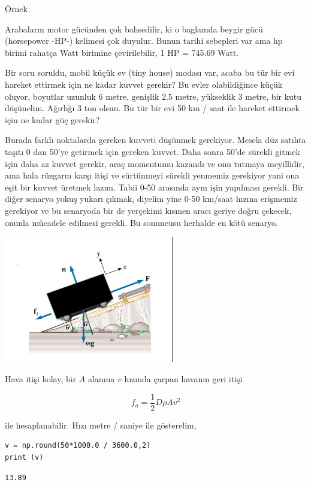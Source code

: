 \documentclass[12pt,fleqn]{article}\usepackage{../../common}
\begin{document}
Örnek

Arabaların motor gücünden çok bahsedilir, ki o baglamda beygir gücü (horsepower
-HP-) kelimesi çok duyulur. Bunun tarihi sebepleri var ama hp birimi rahatça
Watt birimine çevirilebilir, 1 HP = 745.69 Watt.

Bir soru soruldu, mobil küçük ev (tiny house) modası var, acaba bu tür bir evi
hareket ettirmek için ne kadar kuvvet gerekir? Bu evler olabildiğince küçük
oluyor, boyutlar uzunluk 6 metre, genişlik 2.5 metre, yükseklik 3 metre, bir
kutu düşünelim. Ağırlığı 3 ton olsun. Bu tür bir evi 50 km / saat ile hareket
ettirmek için ne kadar güç gerekir?

Burada farklı noktalarda gereken kuvveti düşünmek gerekiyor. Mesela düz satıhta
taşıtı 0 dan 50'ye getirmek için gereken kuvvet. Daha sonra 50'de sürekli gitmek
için daha az kuvvet gerekir, araç momentumu kazandı ve onu tutmaya meyillidir,
ama hala rüzgarın karşı itişi ve sürtünmeyi sürekli yenmemiz gerekiyor yani ona
eşit bir kuvvet üretmek lazım. Tabii 0-50 arasında aynı işin yapılması
gerekli. Bir diğer senaryo yokuş yukarı çıkmak, diyelim yine 0-50 km/saat hızına
erişmemiz gerekiyor ve bu senaryoda bir de yerçekimi kısmen aracı geriye doğru
çekecek, onunla mücadele edilmesi gerekli. Bu sonuncusu herhalde en kötü senaryo.

\includegraphics[width=20em]{phy_005_basics_01_07.jpg}

Hava itişi kolay, bir $A$ alanına $v$ hızında çarpan havanın geri itişi

$$
f_a = \frac{1}{2} D \rho A v^2
$$

ile hesaplanabilir. Hızı metre / saniye ile gösterelim,

\begin{verbatim}
v = np.round(50*1000.0 / 3600.0,2)
print (v)
\end{verbatim}

\begin{verbatim}
13.89
\end{verbatim}
\end{document}
